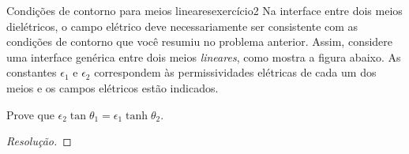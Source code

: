 \begin{exercício}{Condições de contorno para meios lineares}{exercício2}
    Na interface entre dois meios dielétricos, o campo elétrico deve necessariamente ser consistente com as condições de contorno que você resumiu no problema anterior. Assim, considere uma interface genérica entre dois meios \emph{lineares}, como mostra a figura abaixo. As constantes \(\epsilon_1\) e \(\epsilon_2\) correspondem às permissividades elétricas de cada um dos meios e os campos elétricos estão indicados.

    Prove que \(\epsilon_2 \tan{\theta_1} = \epsilon_1 \tanh{\theta_2}\).
\end{exercício}
\begin{proof}[Resolução]

\end{proof}
